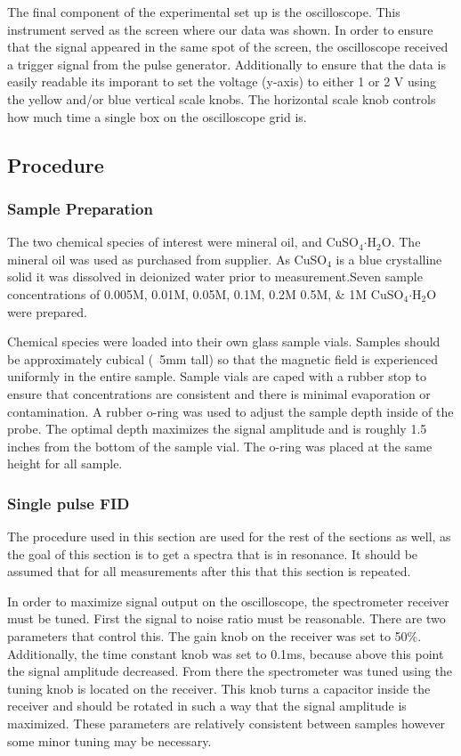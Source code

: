 \documentclass[
reprint,
amsmath,amssymb,
aps,
tikz,
border=5pt
]{revtex4-1}
\newcommand*{\cuso}[1][]{CuSO$_{4} \boldsymbol{\cdot} $H$_2$O }
\begin{document}
    The final component of the experimental set up is the oscilloscope. This instrument served as the screen where our data was shown. In order to ensure that the signal appeared in the same spot of the screen, the oscilloscope received a trigger signal from the pulse generator. Additionally to ensure that the data is easily readable its imporant to set the voltage (y-axis) to either 1 or 2 V using the yellow and/or blue vertical scale knobs. The horizontal scale knob controls how much time a single box on the oscilloscope grid is. 

\subsection*{Procedure}

\subsubsection*{Sample Preparation} 
    The two chemical species of interest were mineral oil, and CuSO$_{4} \boldsymbol{\cdot} $H$_2$O. The mineral oil was used as purchased from supplier. As CuSO$_{4}$ is a blue crystalline solid it was dissolved in deionized water prior to measurement.Seven sample concentrations of 0.005M, 0.01M, 0.05M, 0.1M, 0.2M 0.5M, \& 1M \cuso were prepared. 

    Chemical species were loaded into their own glass sample vials. Samples should be approximately cubical (~5mm tall) so that the magnetic field is experienced uniformly in the entire sample. Sample vials are caped with a rubber stop to ensure that concentrations are consistent and there is minimal evaporation or contamination. A rubber o-ring was used to adjust the sample depth inside of the probe. The optimal depth maximizes the signal amplitude and is roughly 1.5 inches from the bottom of the sample vial. The o-ring was placed at the same height for all sample. 


\subsubsection*{Single pulse FID}
    
    The procedure used in this section are used for the rest of the sections as well, as the goal of this section is to get a spectra that is in resonance. It should be assumed that for all measurements after this that this section is repeated.

    In order to maximize signal output on the oscilloscope, the spectrometer receiver must be tuned. First the signal to noise ratio must be reasonable. There are two parameters that control this. The gain knob on the receiver was set to 50\%. Additionally, the time constant knob was set to 0.1ms, because above this point the signal amplitude decreased. From there the spectrometer was tuned using the tuning knob is located on the receiver. This knob turns a capacitor inside the receiver and should be rotated in such a way that the signal amplitude is maximized. These parameters are relatively consistent between samples however some minor tuning may be necessary.
\end{document}
